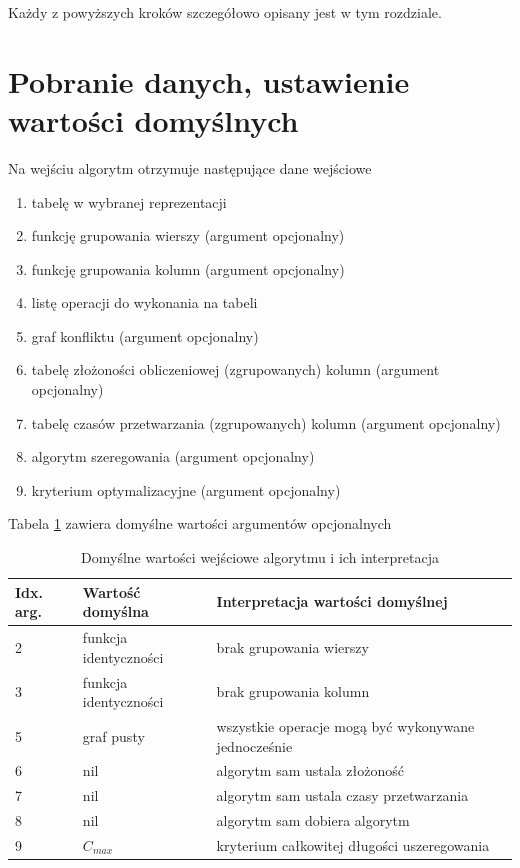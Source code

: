 \documentclass[brudnopis]{xmgr}
\begin{document}
Każdy z powyższych kroków szczegółowo opisany jest w tym rozdziale.
\newpage

\section{Pobranie danych, ustawienie wartości domyślnych}

Na wejściu algorytm otrzymuje następujące dane wejściowe

\begin{enumerate}
    \item tabelę w wybranej reprezentacji
    \item funkcję grupowania wierszy (argument opcjonalny)
    \item funkcję grupowania kolumn (argument opcjonalny)
    \item listę operacji do wykonania na tabeli
    \item graf konfliktu (argument opcjonalny)
    \item tabelę złożoności obliczeniowej (zgrupowanych) kolumn (argument opcjonalny)
    \item tabelę czasów przetwarzania (zgrupowanych) kolumn (argument opcjonalny)
    \item algorytm szeregowania (argument opcjonalny)
    \item kryterium optymalizacyjne (argument opcjonalny)
\end{enumerate}


Tabela \ref{tab:args-default} zawiera domyślne wartości argumentów opcjonalnych
\medskip\\


\begin{table}[!tbh]
\begin{tabular}{|l|l|l|} \hline
Idx. arg. & Wartość domyślna & Interpretacja wartości domyślnej \\ \hline
2 & funkcja identyczności   & brak grupowania wierszy \\ \hline
3 & funkcja identyczności   & brak grupowania kolumn \\ \hline
5 & graf pusty              & wszystkie operacje mogą być wykonywane jednocześnie \\ \hline
6 & nil                     & algorytm sam ustala złożoność \\ \hline
7 & nil                     & algorytm sam ustala czasy przetwarzania \\ \hline
8 & nil                     & algorytm sam dobiera algorytm \\ \hline
9 & $C_{max}$               & kryterium całkowitej długości uszeregowania \\ \hline
\end{tabular}
\caption{Domyślne wartości wejściowe algorytmu i ich interpretacja\label{tab:args-default}}
\end{table}
\medskip\\
\end{document}
